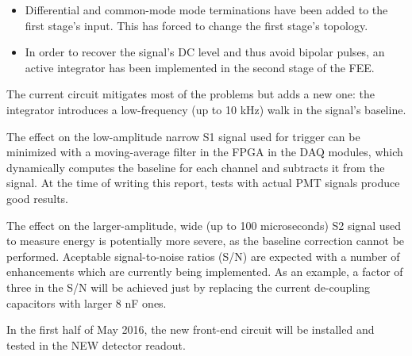 \begin{itemize}
\item Differential and common-mode mode terminations have been added to the first stage's input. This has forced to change the first stage's topology.
\item In order to recover the signal's DC level and thus avoid bipolar pulses, an active integrator has been implemented in the second stage of the FEE.
\end{itemize}

The current circuit mitigates most of the problems but adds a new one: the integrator introduces a low-frequency (up to 10 kHz) walk in the signal's baseline.

The effect on the low-amplitude narrow S1 signal used for trigger can be minimized with a moving-average filter in the FPGA in the DAQ modules, 
which dynamically computes the baseline for each channel and subtracts it from the signal. At the time of writing this report, tests with actual PMT signals produce good results.

The effect on the larger-amplitude, wide (up to 100 microseconds) S2 signal used to measure energy is potentially more severe, as the baseline correction cannot be performed.
Aceptable signal-to-noise ratios (S/N) are expected with a number of enhancements which are currently being implemented. 
As an example, a factor of three in the S/N will be achieved just by replacing the current de-coupling capacitors with larger 8 nF ones. 

In the first half of May 2016, the new front-end circuit will be installed and tested in the NEW detector readout.

